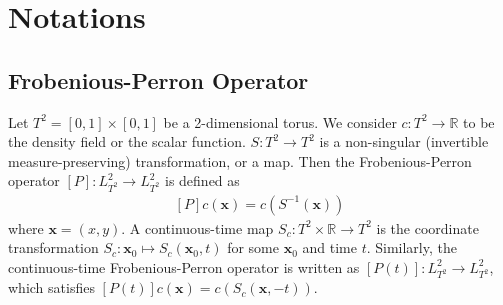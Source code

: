 \documentclass{article}
\begin{document}







\section{Notations}
\label{Notations}
\subsection{Frobenious-Perron Operator}
Let $T^2 =[0,1]\times[0,1]$ be a 2-dimensional torus. We consider $c:T^2 \rightarrow \mathbb{R}$ to be the density field or the scalar function. $S:T^2\rightarrow T^2$ is a non-singular (invertible measure-preserving) transformation, or a map. Then the Frobenious-Perron operator $[P]:L_{T^2}^2\rightarrow L_{T^2}^2$ is defined as
\begin{eqnarray}
\label{FPoperator}
  [P]c(\mathbf{x})=c(S^{-1}(\mathbf{x}))
\end{eqnarray}
where $\mathbf{x}=(x,y)$. A continuous-time map $S_c: T^2 \times \mathbb{R} \rightarrow T^2$ is the coordinate transformation $S_c: \mathbf{x}_0 \mapsto S_c(\mathbf{x}_0,t) $ for some $\mathbf{x}_0$ and time $t$. Similarly, the continuous-time Frobenious-Perron operator is written as $[P(t)]:L_{T^2}^2\rightarrow L_{T^2}^2$, which satisfies $[P(t)]c(\mathbf{x}) = c(S_c(\mathbf{x},-t))$.
\end{document}
